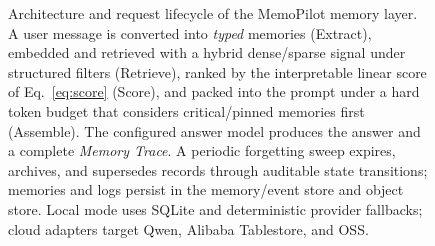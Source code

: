 \begin{figure}[tbp]
{%
}
\caption{Architecture and request lifecycle of the MemoPilot memory layer. A user message is
converted into \emph{typed} memories (Extract), embedded and retrieved with a
hybrid dense/sparse signal under structured filters (Retrieve), ranked by the
interpretable linear score of Eq.~\ref{eq:score} (Score), and packed into the
prompt under a hard token budget that considers critical/pinned memories first
(Assemble). The configured answer model produces the answer and a complete
\emph{Memory Trace}.
A periodic forgetting sweep expires, archives, and supersedes records through
auditable state transitions; memories and logs persist in the memory/event store
and object store. Local mode uses SQLite and deterministic provider fallbacks;
cloud adapters target Qwen, Alibaba Tablestore, and OSS.}
\label{fig:arch}
\end{figure}
